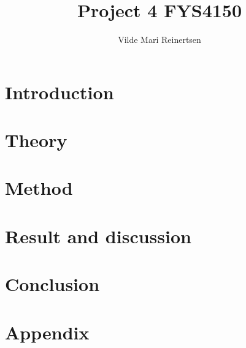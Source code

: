 

\title{Project 4 FYS4150}
\author{Vilde Mari Reinertsen}
\raggedbottom



\maketitle

\begin{abstract}







  
\tableofcontents
\end{abstract}

\twocolumn

\section{Introduction}


\section{Theory}


\section{Method}


\section{Result and discussion}


%

\section{Conclusion}






\onecolumn
\newpage

\section*{Appendix}




